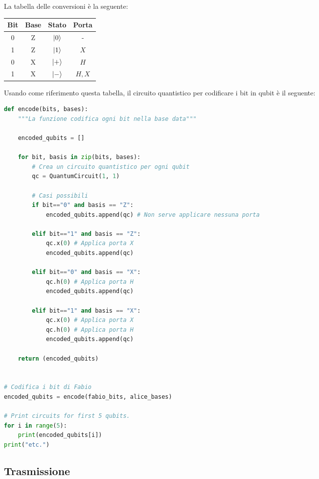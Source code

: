 \documentclass[a4paper]{article}
\begin{document}
La tabella delle conversioni è la seguente:
\begin{table}[H]
  \centering
  \begin{tabular}{|c|c|c|c|}
    \hline
    \textbf{Bit} & \textbf{Base} & \textbf{Stato} & \textbf{Porta} \\ \hline
    0 & Z & $\ket{0}$ & - \\ \hline
    1 & Z & $\ket{1}$ & \( X \) \\ \hline
    0 & X & $\ket{+}$ & \( H \) \\ \hline
    1 & X & $\ket{-}$ & \( H,X \) \\ \hline
  \end{tabular}
\end{table}
Usando come riferimento questa tabella, il circuito quantistico per codificare i bit
in qubit è il seguente:
\begin{lstlisting}[language=Python]
def encode(bits, bases):
    """La funzione codifica ogni bit nella base data"""
    
    encoded_qubits = []
    
    for bit, basis in zip(bits, bases):
        # Crea un circuito quantistico per ogni qubit
        qc = QuantumCircuit(1, 1)
        
        # Casi possibili
        if bit=="0" and basis == "Z":
            encoded_qubits.append(qc) # Non serve applicare nessuna porta

        elif bit=="1" and basis == "Z":
            qc.x(0) # Applica porta X
            encoded_qubits.append(qc)

        elif bit=="0" and basis == "X":
            qc.h(0) # Applica porta H
            encoded_qubits.append(qc)

        elif bit=="1" and basis == "X":
            qc.x(0) # Applica porta X
            qc.h(0) # Applica porta H
            encoded_qubits.append(qc)
            
    return (encoded_qubits)


# Codifica i bit di Fabio
encoded_qubits = encode(fabio_bits, alice_bases)

# Print circuits for first 5 qubits.
for i in range(5):
    print(encoded_qubits[i])
print("etc.")
\end{lstlisting}

\subsection{Trasmissione}
\end{document}
